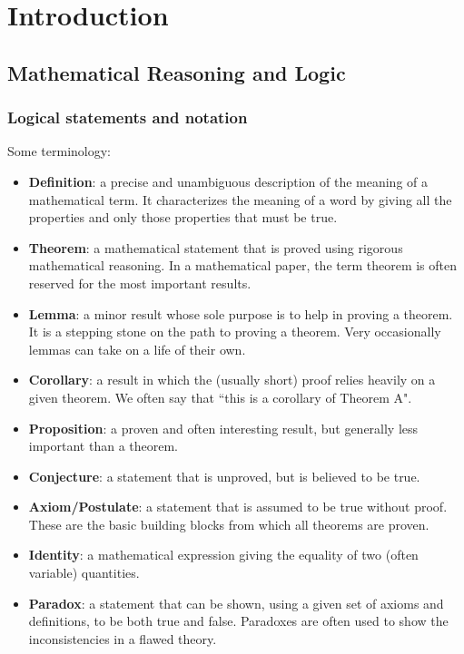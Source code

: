 \part{Introduction}
\chapter{Mathematical Reasoning and Logic}

\section{Logical statements and notation}
Some terminology:
\begin{itemize}
\item \textbf{Definition}: a precise and unambiguous description of the meaning of a mathematical term. It characterizes the meaning of a word by giving all the properties and only those properties that must be true.

\item \textbf{Theorem}: a mathematical statement that is proved using rigorous mathematical reasoning. In a mathematical paper, the term theorem is often reserved for the most important results.

\item \textbf{Lemma}: a minor result whose sole purpose is to help in proving a theorem. It is a stepping stone on the path to proving a theorem. Very occasionally lemmas can take on a life of their own.

\item \textbf{Corollary}: a result in which the (usually short) proof relies heavily on a given theorem. We often say that ``this is a corollary of Theorem A".

\item \textbf{Proposition}: a proven and often interesting result, but generally less important than a theorem.

\item \textbf{Conjecture}: a statement that is unproved, but is believed to be true.

\item \textbf{Axiom/Postulate}: a statement that is assumed to be true without proof. These are the basic building blocks from which all theorems are proven.

\item \textbf{Identity}: a mathematical expression giving the equality of two (often variable) quantities.

\item \textbf{Paradox}: a statement that can be shown, using a given set of axioms and definitions, to be both true and false. Paradoxes are often used to show the inconsistencies in a flawed theory.
\end{itemize}

